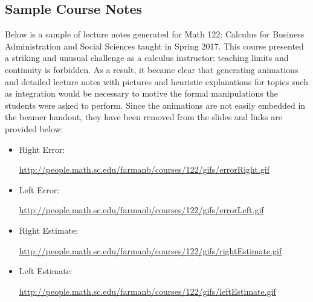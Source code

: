 \documentclass[teaching.portfolio.tex]{subfiles}
\begin{document}
\subsection{Sample Course Notes}
Below is a sample of lecture notes generated for Math 122: Calculus for Business Administration and Social Sciences taught in Spring 2017.
This course presented a striking and unusual challenge as a calculus instructor: teaching limits and continuity is forbidden.
As a result, it became clear that generating animations and detailed lecture notes with pictures and heuristic explanations for topics such as integration would be necessary to motive the formal manipulations the students were asked to perform.
Since the animations are not easily embedded in the beamer handout, they have been removed from the slides and links are provided below:
\begin{itemize}
\item
  Right Error:
  \begin{center}
    \url{http://people.math.sc.edu/farmanb/courses/122/gifs/errorRight.gif}
  \end{center}
\item
  Left Error:
  \begin{center}
    \url{http://people.math.sc.edu/farmanb/courses/122/gifs/errorLeft.gif}
  \end{center}
\item
  Right Estimate:
  \begin{center}
    \url{http://people.math.sc.edu/farmanb/courses/122/gifs/rightEstimate.gif}
  \end{center}
\item
  Left Estimate:
  \begin{center}
    \url{http://people.math.sc.edu/farmanb/courses/122/gifs/leftEstimate.gif}
  \end{center}
\end{itemize}

\end{document}
